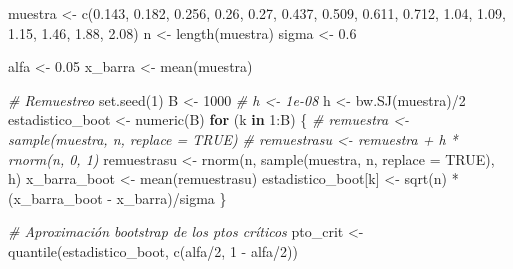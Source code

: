\documentclass[
]{book}
\newenvironment{Shaded}{\begin{snugshade}}{\end{snugshade}}
\newcommand{\AttributeTok}[1]{\textcolor[rgb]{0.77,0.63,0.00}{#1}}
\newcommand{\CommentTok}[1]{\textcolor[rgb]{0.56,0.35,0.01}{\textit{#1}}}
\newcommand{\ConstantTok}[1]{\textcolor[rgb]{0.00,0.00,0.00}{#1}}
\newcommand{\ControlFlowTok}[1]{\textcolor[rgb]{0.13,0.29,0.53}{\textbf{#1}}}
\newcommand{\DecValTok}[1]{\textcolor[rgb]{0.00,0.00,0.81}{#1}}
\newcommand{\FloatTok}[1]{\textcolor[rgb]{0.00,0.00,0.81}{#1}}
\newcommand{\FunctionTok}[1]{\textcolor[rgb]{0.00,0.00,0.00}{#1}}
\newcommand{\NormalTok}[1]{#1}
\newcommand{\OtherTok}[1]{\textcolor[rgb]{0.56,0.35,0.01}{#1}}
\newcommand{\SpecialCharTok}[1]{\textcolor[rgb]{0.00,0.00,0.00}{#1}}
\theoremstyle{break}
\theoremstyle{definition}
\theoremstyle{definition}
\theoremstyle{definition}
\theoremstyle{definition}
\theoremstyle{remark}
\begin{document}
\begin{Shaded}
\begin{Highlighting}[]
\NormalTok{muestra }\OtherTok{\textless{}{-}} \FunctionTok{c}\NormalTok{(}\FloatTok{0.143}\NormalTok{, }\FloatTok{0.182}\NormalTok{, }\FloatTok{0.256}\NormalTok{, }\FloatTok{0.26}\NormalTok{, }\FloatTok{0.27}\NormalTok{, }\FloatTok{0.437}\NormalTok{, }\FloatTok{0.509}\NormalTok{, }
             \FloatTok{0.611}\NormalTok{, }\FloatTok{0.712}\NormalTok{, }\FloatTok{1.04}\NormalTok{, }\FloatTok{1.09}\NormalTok{, }\FloatTok{1.15}\NormalTok{, }\FloatTok{1.46}\NormalTok{, }\FloatTok{1.88}\NormalTok{, }\FloatTok{2.08}\NormalTok{)}
\NormalTok{n }\OtherTok{\textless{}{-}} \FunctionTok{length}\NormalTok{(muestra)}
\NormalTok{sigma }\OtherTok{\textless{}{-}} \FloatTok{0.6}

\NormalTok{alfa }\OtherTok{\textless{}{-}} \FloatTok{0.05}
\NormalTok{x\_barra }\OtherTok{\textless{}{-}} \FunctionTok{mean}\NormalTok{(muestra)}

\CommentTok{\# Remuestreo}
\FunctionTok{set.seed}\NormalTok{(}\DecValTok{1}\NormalTok{)}
\NormalTok{B }\OtherTok{\textless{}{-}} \DecValTok{1000}
\CommentTok{\# h \textless{}{-} 1e{-}08}
\NormalTok{h }\OtherTok{\textless{}{-}} \FunctionTok{bw.SJ}\NormalTok{(muestra)}\SpecialCharTok{/}\DecValTok{2}
\NormalTok{estadistico\_boot }\OtherTok{\textless{}{-}} \FunctionTok{numeric}\NormalTok{(B)}
\ControlFlowTok{for}\NormalTok{ (k }\ControlFlowTok{in} \DecValTok{1}\SpecialCharTok{:}\NormalTok{B) \{}
    \CommentTok{\# remuestra \textless{}{-} sample(muestra, n, replace = TRUE)}
    \CommentTok{\# remuestrasu \textless{}{-} remuestra + h * rnorm(n, 0, 1)}
\NormalTok{    remuestrasu }\OtherTok{\textless{}{-}} \FunctionTok{rnorm}\NormalTok{(n, }\FunctionTok{sample}\NormalTok{(muestra, n, }\AttributeTok{replace =} \ConstantTok{TRUE}\NormalTok{), h)}
\NormalTok{    x\_barra\_boot }\OtherTok{\textless{}{-}} \FunctionTok{mean}\NormalTok{(remuestrasu)}
\NormalTok{    estadistico\_boot[k] }\OtherTok{\textless{}{-}} \FunctionTok{sqrt}\NormalTok{(n) }\SpecialCharTok{*}\NormalTok{ (x\_barra\_boot }\SpecialCharTok{{-}}\NormalTok{ x\_barra)}\SpecialCharTok{/}\NormalTok{sigma}
\NormalTok{\}}

\CommentTok{\# Aproximación bootstrap de los ptos críticos}
\NormalTok{pto\_crit }\OtherTok{\textless{}{-}} \FunctionTok{quantile}\NormalTok{(estadistico\_boot, }\FunctionTok{c}\NormalTok{(alfa}\SpecialCharTok{/}\DecValTok{2}\NormalTok{, }\DecValTok{1} \SpecialCharTok{{-}}\NormalTok{ alfa}\SpecialCharTok{/}\DecValTok{2}\NormalTok{))}


\end{Highlighting}
\end{Shaded}
\end{document}
